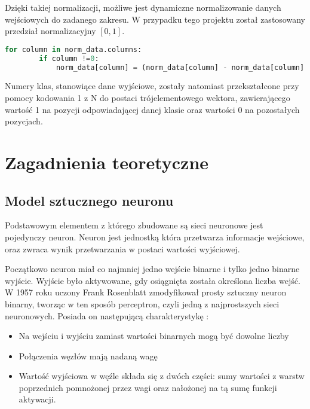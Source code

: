 \documentclass[12pt,twoside]{article}
\begin{document}
Dzięki takiej normalizacji, możliwe jest dynamiczne normalizowanie danych wejściowych do zadanego zakresu. W przypadku tego projektu został zastosowany przedział normalizacyjny $ [0, 1]$.\\

\begin{lstlisting}[language=Python,caption=Algorytm normalizacji,label={Kod1}]
    for column in norm_data.columns:
        if column !=0:
            norm_data[column] = (norm_data[column] - norm_data[column].min()) / (norm_data[column].max() - norm_data[column].min())

\end{lstlisting}

Numery klas, stanowiące dane wyjściowe, zostały natomiast przekształcone przy pomocy kodowania 1 z N do postaci trójelementowego wektora, zawierającego wartość 1 na pozycji odpowiadającej danej klasie oraz wartości 0 na pozostałych pozycjach.



\clearpage
\section{Zagadnienia teoretyczne}
\subsection{Model sztucznego neuronu}
Podstawowym elementem z którego zbudowane są sieci neuronowe jest pojedynczy neuron. Neuron jest jednostką która przetwarza informacje wejściowe, oraz zwraca wynik przetwarzania w postaci wartości wyjściowej. 


Początkowo neuron miał co najmniej jedno wejście binarne i tylko jedno binarne wyjście. Wyjście było aktywowane, gdy osiągnięta została określona liczba wejść. W 1957 roku uczony Frank Rosenblatt zmodyfikował prosty sztuczny neuron binarny, tworząc w ten sposób perceptron, czyli jedną z najprostszych sieci neuronowych. Posiada on następującą charakterystykę \cite{mamczur}:
\begin{itemize}
\item Na wejściu i wyjściu zamiast wartości binarnych mogą być dowolne liczby
\item Połączenia węzłów mają nadaną wagę
\item Wartość wyjściowa w węźle składa się z dwóch części: sumy wartości z warstw poprzednich pomnożonej przez wagi oraz nałożonej na tą sumę funkcji aktywacji.
\end{itemize}
\end{document}
